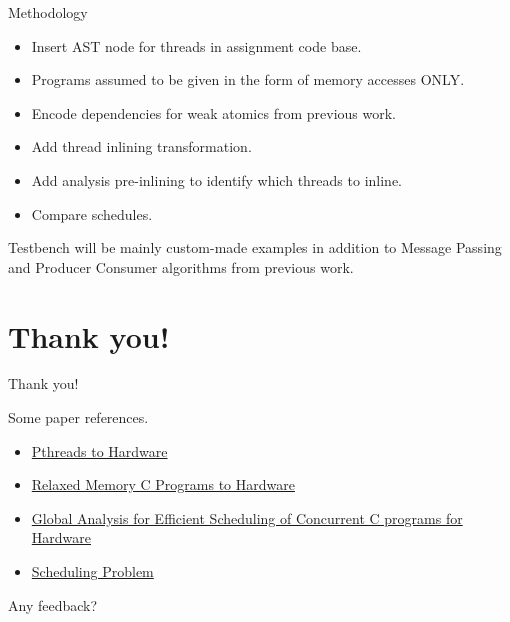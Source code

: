 \documentclass[notes, xcolor=dvipsnames]{beamer}
\begin{document}
    \begin{frame}{Methodology}

        \begin{itemize}
            \item Insert AST node for threads in assignment code base. 
            \item Programs assumed to be given in the form of memory accesses ONLY.
            \item Encode dependencies for weak atomics from previous work.
            \item Add thread inlining transformation.
            \item Add analysis pre-inlining to identify which threads to inline. 
            \item Compare schedules.
        \end{itemize}

        Testbench will be mainly custom-made examples in addition to Message Passing and Producer Consumer algorithms from previous work.

    \end{frame}
    
    \section{Thank you!}
    \begin{frame}{Thank you!}

        Some paper references.
        \begin{itemize}
            \item \href{https://janders.eecg.utoronto.ca/pdfs/james.pdf}{Pthreads to Hardware}
            \item \href{https://johnwickerson.github.io/papers/feetup_TC.pdf}{Relaxed Memory C Programs to Hardware}
            \item \href{https://johnwickerson.github.io/papers/cats_TVLSI.pdf}{Global Analysis for Efficient Scheduling of Concurrent C programs for Hardware}
            \item \href{http://www.cs.kent.edu/~walker/papers/dtsched.pdf}{Scheduling Problem}
        \end{itemize}

        Any feedback? 

        
    \end{frame}
\end{document}
